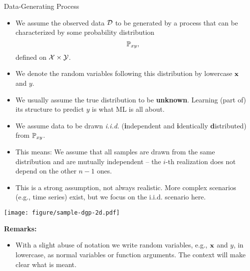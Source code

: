 \documentclass[11pt,compress,t,notes=noshow, xcolor=table]{beamer}
\begin{document}
\begin{vbframe}{Data-Generating Process}

\begin{itemize}

  \item We assume the observed data $\mathcal{D}$ to be generated by a process that can
  be characterized by some probability distribution $$\mathbb{P}_{xy},$$ defined on 
  $\mathcal{X} \times \mathcal{Y}$.
  
  \item We denote the random variables following this 
  distribution by lowercase $\mathbf{x}$ and $y$.
  
  \item We usually assume the true distribution to be \textbf{unknown}. 
  Learning (part of) its structure to predict $y$ is what ML is all about.
  
  \framebreak
  
  \item We assume data to be drawn \emph{i.i.d.} (\textbf{i}ndependent and \textbf{i}dentically 
    \textbf{d}istributed) from $\mathbb{P}_{xy}$. %

    
    \item This means: We assume that all samples are drawn from the same distribution 
    and are mutually independent -- the $i$-th realization does not depend on the
    other $n-1$ ones.
    
    \item This is a strong assumption, not always realistic. 
    More complex scenarios (e.g., time series) exist, but we focus on the i.i.d. scenario here. 
\end{itemize}

{
\texttt{[image: figure/sample-dgp-2d.pdf]}
}

\framebreak

\textbf{Remarks:}

\begin{itemize}

  \item With a slight abuse of notation we write random variables, e.g., $\mathbf{x}$ 
  and $y$, in lowercase, as normal variables or function arguments. The context 
  will make clear what is meant.
  

\end{itemize}
\end{vbframe}
\end{document}
